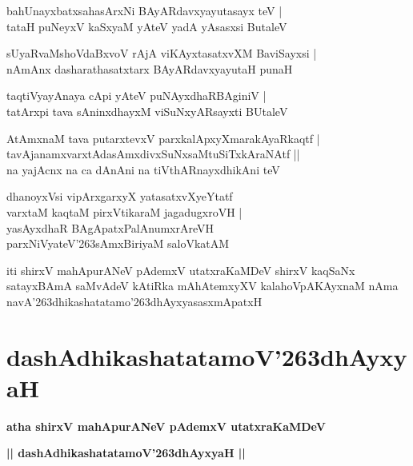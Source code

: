 \documentclass[twoside,12pt,openright]{book}
\def\S{\char'263}
\newcounter{shloka}[chapter]
\begin{document}
\begin{shloka}%
bahUnayxbatxsahasArxNi BAyARdavxyayutasayx teV |\\
tataH puNeyxV kaSxyaM yAteV yadA yAsasxsi ButaleV 
\end{shloka}

\begin{shloka}%
sUyaRvaMshoVdaBxvoV rAjA viKAyxtasatxvXM BaviSayxsi |\\
nAmAnx dasharathasatxtarx BAyARdavxyayutaH punaH 
\end{shloka}

\begin{shloka}%
taqtiVyayAnaya cApi yAteV puNAyxdhaRBAginiV |\\
tatArxpi tava sAninxdhayxM viSuNxyARsayxti BUtaleV 
\end{shloka}

\begin{shloka}%
AtAmxnaM tava putarxtevxV parxkalApxyXmarakAyaRkaqtf |\\
tavAjanamxvarxtAdasAmxdivxSuNxsaMtuSiTxkAraNAtf ||\\
na yajAcnx na ca dAnAni na tiVthARnayxdhikAni teV 
\end{shloka}

\begin{shloka}%
dhanoyxVsi vipArxgarxyX yatasatxvXyeYtatf \\
varxtaM kaqtaM pirxVtikaraM jagadugxroVH |\\
yasAyxdhaR BAgApatxPalAnumxrAreVH \\
parxNiVyateV\S sAmxBiriyaM saloVkatAM 
\end{shloka}

\begin{center}
iti shirxV mahApurANeV pAdemxV utatxraKaMDeV shirxV kaqSaNx satayxBAmA saMvAdeV kAtiRka 
mAhAtemxyXV kalahoVpAKAyxnaM nAma navA\S dhikashatatamo\S dhAyxyasasxmApatxH 
\end{center}

\chapter{dashAdhikashatatamoV\S dhAyxyaH}

\begin{center}
{\LARGE\bfseries atha shirxV mahApurANeV pAdemxV utatxraKaMDeV}
\end{center}

\begin{center}
{\LARGE\bfseries || dashAdhikashatatamoV\S dhAyxyaH || }
\end{center}
\end{document}
